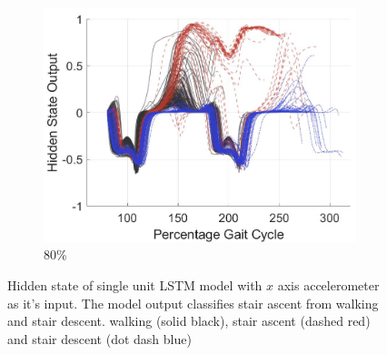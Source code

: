 \documentclass[sensors,article,submit,moreauthors,pdftex]{Definitions/mdpi}
\begin{document}
\begin{figure}[!hbt]
     \begin{subfigure}[b]{0.32\textwidth}
         \centering
         \includegraphics[width=\textwidth]{Figures/results/hidden_state/gyro_y_sa_v_w-sd/80_Participant_04.jpg}
         \caption{80\%}
         \label{subfig:gyro_y_w_v_sa_sd_80}
     \end{subfigure}
    \caption{Hidden state of single unit LSTM model with $x$ axis accelerometer as it's input. The model output classifies stair ascent from walking and stair descent. walking (solid black), stair ascent (dashed red) and stair descent (dot dash blue)}
    \label{fig:hidden-state-gyro-y-w_v_sa-sd}
\end{figure}
\end{document}
